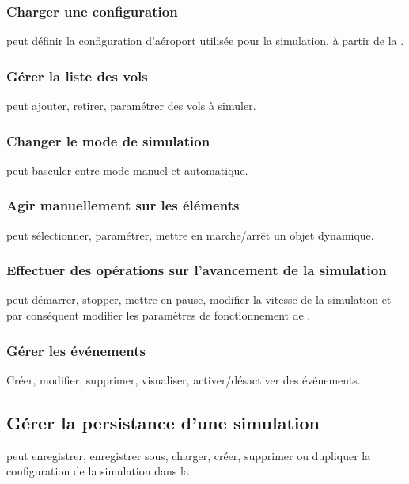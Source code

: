 \subsubsection{Charger une configuration} 
 peut définir la configuration d'aéroport utilisée pour la simulation, à partir de la .

\subsubsection{Gérer la liste des vols}
 peut ajouter, retirer, paramétrer des vols à simuler.

\subsubsection{Changer le mode de simulation}
 peut basculer entre mode manuel et automatique.

\subsubsection{Agir manuellement sur les éléments}
 peut sélectionner, paramétrer, mettre en marche/arrêt un objet dynamique.

\subsubsection{Effectuer des opérations sur l'avancement de la simulation}
 peut démarrer, stopper, mettre en pause, modifier la vitesse de la simulation et par conséquent modifier les paramètres de fonctionnement de .

\subsubsection{Gérer les événements}
Créer, modifier, supprimer, visualiser, activer/désactiver des événements.

\subsection{Gérer la persistance d'une simulation}
 peut enregistrer, enregistrer sous, charger, créer, supprimer ou dupliquer la configuration de la simulation dans la 

